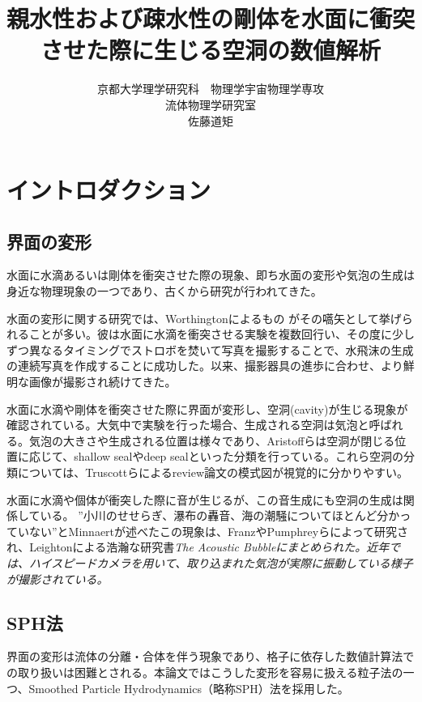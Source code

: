 \documentclass[]{jsarticle}
\begin{document}
\title{親水性および疎水性の剛体を水面に衝突させた際に生じる空洞の数値解析}
\author{京都大学理学研究科　物理学宇宙物理学専攻\\流体物理学研究室\\佐藤道矩}
\maketitle
\newpage

\tableofcontents
\newpage
\section{イントロダクション}
\subsection{界面の変形}
水面に水滴あるいは剛体を衝突させた際の現象、即ち水面の変形や気泡の生成は身近な物理現象の一つであり、古くから研究が行われてきた。

水面の変形に関する研究では、Worthingtonによるもの \cite{Worthington1908}がその嚆矢として挙げられることが多い。彼は水面に水滴を衝突させる実験を複数回行い、その度に少しずつ異なるタイミングでストロボを焚いて写真を撮影することで、水飛沫の生成の連続写真を作成することに成功した。以来、撮影器具の進歩に合わせ、より鮮明な画像が撮影され続けてきた。

水面に水滴や剛体を衝突させた際に界面が変形し、空洞(cavity)が生じる現象が確認されている。大気中で実験を行った場合、生成される空洞は気泡と呼ばれる。気泡の大きさや生成される位置は様々であり、Aristoffらは空洞が閉じる位置に応じて、shallow sealやdeep sealといった分類を行っている\cite{Aristoff2009}。これら空洞の分類については、Truscottらによるreview論文\cite{Truscott2014}の模式図が視覚的に分かりやすい。

水面に水滴や個体が衝突した際に音が生じるが、この音生成にも空洞の生成は関係している。
”小川のせせらぎ、瀑布の轟音、海の潮騒についてほとんど分かっていない”とMinnaert\cite{minnaert1933xvi}が述べたこの現象は、Franz\cite{Franz1959}やPumphrey\cite{Pumphrey1990}らによって研究され、Leightonによる浩瀚な研究書\it{The Acoustic Bubble}\rm\cite{leightonacoustic}にまとめられた。近年では、ハイスピードカメラを用いて、取り込まれた気泡が実際に振動している様子が撮影されている\cite{Phillips2018}。

\subsection{SPH法}
界面の変形は流体の分離・合体を伴う現象であり、格子に依存した数値計算法での取り扱いは困難とされる。本論文ではこうした変形を容易に扱える粒子法の一つ、Smoothed Particle Hydrodynamics（略称SPH）法を採用した。
\end{document}
